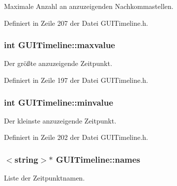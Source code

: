 Maximale Anzahl an anzuzeigenden Nachkommastellen. 



Definiert in Zeile 207 der Datei G\-U\-I\-Timeline.\-h.

\hypertarget{classGUITimeline_a6c639803db9c5afff38d3221242da912}{
\subsubsection[{maxvalue}]{\setlength{\rightskip}{0pt plus 5cm}int G\-U\-I\-Timeline\-::maxvalue\hspace{0.3cm}{\ttfamily [private]}}}\label{classGUITimeline_a6c639803db9c5afff38d3221242da912}


Der größte anzuzeigende Zeitpunkt. 



Definiert in Zeile 197 der Datei G\-U\-I\-Timeline.\-h.

\hypertarget{classGUITimeline_aad9f2b796d0d7c086cfe0094b3ef10c5}{
\subsubsection[{minvalue}]{\setlength{\rightskip}{0pt plus 5cm}int G\-U\-I\-Timeline\-::minvalue\hspace{0.3cm}{\ttfamily [private]}}}\label{classGUITimeline_aad9f2b796d0d7c086cfe0094b3ef10c5}


Der kleinste anzuzeigende Zeitpunkt. 



Definiert in Zeile 202 der Datei G\-U\-I\-Timeline.\-h.

\hypertarget{classGUITimeline_adcdd8d58db7851c24ab9dfdfe1377ffb}{
\subsubsection[{names}]{$<$string$>$$\ast$ G\-U\-I\-Timeline\-::names\hspace{0.3cm}{\ttfamily [private]}}}\label{classGUITimeline_adcdd8d58db7851c24ab9dfdfe1377ffb}


Liste der Zeitpunktnamen. 



